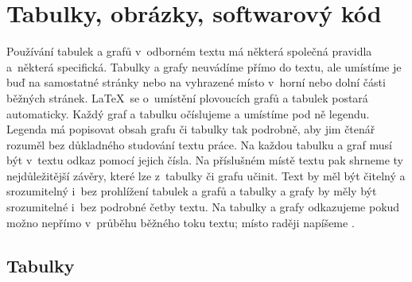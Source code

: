
\chapter{Tabulky, obrázky, softwarový kód}

Používání tabulek a grafů v~odborném textu má některá společná
pravidla a~některá specifická. Tabulky a grafy neuvádíme přímo do
textu, ale umístíme je buď na samostatné stránky nebo na vyhrazené
místo v~horní nebo dolní části běžných stránek. \LaTeX\ se o~umístění
plovoucích grafů a tabulek postará automaticky. Každý graf a tabulku
očíslujeme a umístíme pod ně legendu. Legenda má popisovat obsah grafu
či tabulky tak podrobně, aby jim čtenář rozuměl bez důkladného
studování textu práce. Na každou tabulku a graf musí být v~textu odkaz
pomocí jejich čísla. Na příslušném místě textu pak shrneme ty
nejdůležitější závěry, které lze z~tabulky či grafu učinit. Text by
měl být čitelný a srozumitelný i~bez prohlížení tabulek a grafů a
tabulky a grafy by měly být srozumitelné i~bez podrobné četby textu.
Na tabulky a grafy odkazujeme pokud možno nepřímo v~průběhu běžného
toku textu; místo \emph{} raději napíšeme
\emph{}.

\section{Tabulky}


